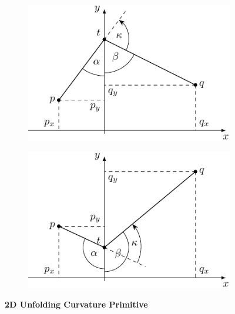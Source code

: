 \documentclass{stdlocal}
\begin{document}
  \begin{figure}[h]
    \centering
    \begin{subfigure}[b]{0.49\linewidth}
      \centering
      \includegraphics[width=0.9\linewidth]{figures/unfolding_curvature_2d.pdf}
    \end{subfigure}
    \hfill
    \begin{subfigure}[b]{0.49\linewidth}
      \centering
      \includegraphics[width=0.9\linewidth]{figures/unfolding_curvature_2d_positive.pdf}
    \end{subfigure}
    \caption[2D Unfolding Curvature Primitive]{%
      \textbf{2D Unfolding Curvature Primitive}\\
    }
    \label{fig:}
  \end{figure}
\end{document}
